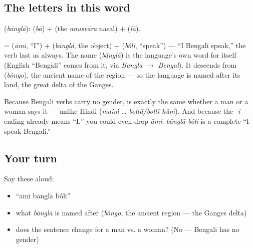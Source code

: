 \subsection*{The letters in this word}
\textbf{} (\emph{bānglā}): \textbf{} (\emph{bā}) + \textbf{} (the \emph{anusvāra} nasal) + \textbf{} (\emph{lā}).

\begin{cousinweb}
\textbf{  } = \textbf{} (\emph{āmi}, \textquotedblleft{}I\textquotedblright{}) + \textbf{} (\emph{bānglā}, the object) + \textbf{} (\emph{bôli}, \textquotedblleft{}speak\textquotedblright{}) — \textquotedblleft{}I Bengali speak,\textquotedblright{} the verb last as always. The name \textbf{} (\emph{bānglā}) is the language's own word for itself (English \textquotedblleft{}Bengali\textquotedblright{} comes from it, via \emph{Bangla} $\to$ \emph{Bengal}). It descends from \textbf{} (\emph{bôngo}), the ancient name of the region — so the language is named after its land, the great delta of the Ganges.
\end{cousinweb}

\begin{grammarlens}[title={Grammar Lens: no gender, so the sentence is the same for anyone}]
Because Bengali verbs carry no gender, \textbf{  } is exactly the same whether a man or a woman says it — unlike Hindi (\emph{maiṁ … boltā/boltī hūṁ}). And because the \emph{-i} ending already means \textquotedblleft{}I,\textquotedblright{} you could even drop \emph{āmi}: \emph{bānglā bôli} is a complete \textquotedblleft{}I speak Bengali.\textquotedblright{}
\end{grammarlens}

\subsection*{Your turn}
Say these aloud:

\begin{itemize}
\raggedright
  \item \textquotedblleft{}āmi bānglā bôli\textquotedblright{}
  \item what \emph{bānglā} is named after (\emph{bôngo}, the ancient region — the Ganges delta)
  \item does the sentence change for a man vs. a woman? (No — Bengali has no gender)
\end{itemize}

